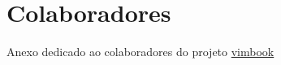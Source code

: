 
\chapter{Colaboradores}\label{colaboradores}

Anexo dedicado ao colaboradores do projeto \href{http://code.google.com/p/vimbook}{vimbook}


